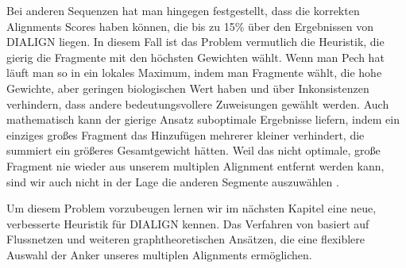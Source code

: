 Bei anderen Sequenzen hat man hingegen festgestellt, dass die korrekten Alignments Scores haben können, die bis zu 15\% über den Ergebnissen von DIALIGN liegen. In diesem Fall ist das Problem vermutlich die Heuristik, die gierig die Fragmente mit den höchsten Gewichten wählt. Wenn man Pech hat läuft man so in ein lokales Maximum, indem man Fragmente wählt, die hohe Gewichte, aber geringen biologischen Wert haben und über Inkonsistenzen verhindern, dass andere bedeutungsvollere Zuweisungen gewählt werden. Auch mathematisch kann der gierige Ansatz suboptimale Ergebnisse liefern, indem ein einziges großes Fragment das Hinzufügen mehrerer kleiner verhindert, die summiert ein größeres Gesamtgewicht hätten. Weil das nicht optimale, große Fragment nie wieder aus unserem multiplen Alignment entfernt werden kann, sind wir auch nicht in der Lage die anderen Segmente auszuwählen \citep{m99}. 

Um diesem Problem vorzubeugen lernen wir im nächsten Kapitel eine neue, verbesserte Heuristik für DIALIGN kennen. Das Verfahren von \cite{cpm10} basiert auf Flussnetzen und weiteren graphtheoretischen Ansätzen, die eine flexiblere Auswahl der Anker unseres multiplen Alignments ermöglichen.